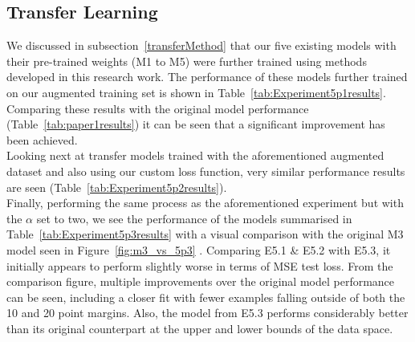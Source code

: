 \begin{figure}[p]
	\label{fig:e4p1_optimal}
\end{figure}

\subsection{Transfer Learning} \label{transferResults}

We discussed in subsection~\ref{transferMethod} that our five existing models with their pre-trained weights (M1 to M5) were further trained using methods developed in this research work. The performance of these models further trained on our augmented training set is shown in Table~\ref{tab:Experiment5p1results}. Comparing these results with the original model performance (Table~\ref{tab:paper1results}) it can be seen that a significant improvement has been achieved.
\\

\noindent
Looking next at transfer models trained with the aforementioned augmented dataset and also using our custom loss function, very similar performance results are seen (Table~\ref{tab:Experiment5p2results}).
\\

\noindent
Finally, performing the same process as the aforementioned experiment but with the $\alpha$ set to two, we see the performance of the models summarised in Table~\ref{tab:Experiment5p3results} with a visual comparison with the original M3 model seen in Figure~\ref{fig:m3_vs_5p3} . Comparing E5.1 \& E5.2 with E5.3, it initially appears to perform slightly worse in terms of MSE test loss. From the comparison figure, multiple improvements over the original model performance can be seen, including a closer fit with fewer examples falling outside of both the 10 and 20 point margins. Also, the model from E5.3 performs considerably better than its original counterpart at the upper and lower bounds of the data space.

